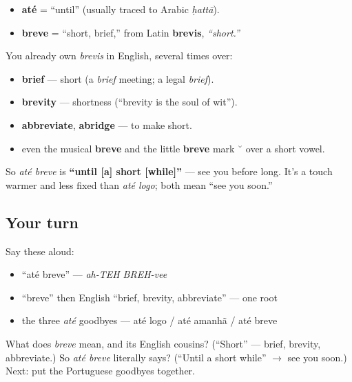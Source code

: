 \begin{cousinweb}
\begin{itemize}
\raggedright
  \item \textbf{até} = \textquotedblleft{}until\textquotedblright{} (usually traced to Arabic \emph{ḥattā}).
  \item \textbf{breve} = \textquotedblleft{}short, brief,\textquotedblright{} from Latin \textbf{brevis}, \emph{\textquotedblleft{}short.\textquotedblright{}}
\end{itemize}

You already own \emph{brevis} in English, several times over:

\begin{itemize}
\raggedright
  \item \textbf{brief} — short (a \emph{brief} meeting; a legal \emph{brief}).
  \item \textbf{brevity} — shortness (\textquotedblleft{}brevity is the soul of wit\textquotedblright{}).
  \item \textbf{abbreviate}, \textbf{abridge} — to make short.
  \item even the musical \textbf{breve} and the little \textbf{breve} mark ˘ over a short vowel.
\end{itemize}

So \emph{até breve} is \textbf{\textquotedblleft{}until {[}a{]} short {[}while{]}\textquotedblright{}} — see you before long. It's a touch warmer and less fixed than \emph{até logo}; both mean \textquotedblleft{}see you soon.\textquotedblright{}
\end{cousinweb}

\subsection*{Your turn}
Say these aloud:

\begin{itemize}
\raggedright
  \item \textquotedblleft{}até breve\textquotedblright{} — \emph{ah-TEH BREH-vee}
  \item \textquotedblleft{}breve\textquotedblright{} then English \textquotedblleft{}brief, brevity, abbreviate\textquotedblright{} — one root
  \item the three \emph{até} goodbyes — até logo / até amanhã / até breve
\end{itemize}

\begin{tcolorbox}[breakable,colback=teal!4,colframe=teal!35!black,title={Before you move on}]
What does \emph{breve} mean, and its English cousins? (\textquotedblleft{}Short\textquotedblright{} — brief, brevity, abbreviate.) So \emph{até breve} literally says? (\textquotedblleft{}Until a short while\textquotedblright{} $\to$ see you soon.) Next: put the Portuguese goodbyes together.
\end{tcolorbox}
